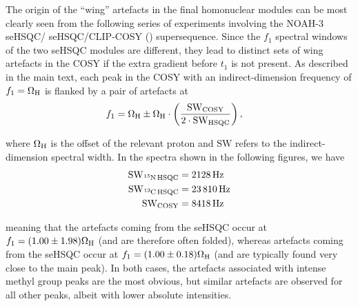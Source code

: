 The origin of the ``wing'' artefacts in the final homonuclear modules can be most clearly seen from the following series of experiments involving the NOAH-3 \nitrogen{} seHSQC/\carbon{} seHSQC/CLIP-COSY () supersequence.
Since the $f_1$ spectral windows of the two seHSQC modules are different, they lead to distinct sets of wing artefacts in the COSY if the extra gradient before $t_1$ is not present.
As described in the main text, each peak in the COSY with an indirect-dimension frequency of $f_1 = \Omega_{\ce{H}}$ is flanked by a pair of artefacts at
\begin{align*}
    f_1 &= \Omega_{\ce{H}} \pm \Omega_{\ce{H}} \cdot \left(\frac{\mathrm{SW_{COSY}}}{2 \cdot \mathrm{SW_{HSQC}}}\right),
\end{align*}

where $\Omega_{\ce{H}}$ is the offset of the relevant proton and $\mathrm{SW}$ refers to the indirect-dimension spectral width.
In the spectra shown in the following figures, we have
\begin{align*}
    \mathrm{SW_{\ce{^15N}\,HSQC}} &= \SI{2128}{\Hz} \\
    \mathrm{SW_{\ce{^13C}\,HSQC}} &= \SI{23810}{\Hz} \\
    \mathrm{SW_{COSY}}            &= \SI{8418}{\Hz}
\end{align*}

meaning that the artefacts coming from the \nitrogen{} seHSQC occur at $f_1 = (1.00 \pm 1.98) \Omega_{\ce{H}}$ (and are therefore often folded), whereas artefacts coming from the \carbon{} seHSQC occur at $f_1 = (1.00 \pm 0.18) \Omega_{\ce{H}}$ (and are typically found very close to the main peak).
In both cases, the artefacts associated with intense methyl group peaks are the most obvious, but similar artefacts are observed for all other peaks, albeit with lower absolute intensities.

